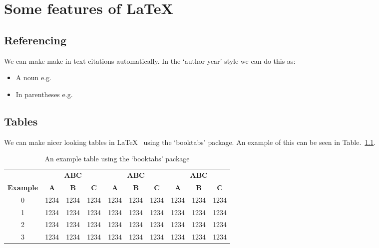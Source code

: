 \chapter{Some features of \LaTeX}

\section{Referencing}
We can make make in text citations automatically.
In the `author-year' style we can do this as:
\begin{itemize}
    \item A noun e.g. \textcite{Gillard2014}
    \item In parentheses e.g. \parencite{Gillard2014}
\end{itemize}

\section{Tables}
We can make nicer looking tables in \LaTeX~ using the `booktabs' package.
An example of this can be seen in Table.~\ref{fig:exampletable}.
\begin{table}[h]
\centering
\caption{An example table using the `booktabs' package}
\label{fig:exampletable}
\begin{tabular}{cccccccccc}
\toprule
& \multicolumn{3}{c}{\textbf{ABC}} & \multicolumn{3}{c}{\textbf{ABC}} & \multicolumn{3}{c}{\textbf{ABC}} \\
\cmidrule(lr){2-4}\cmidrule(lr){5-7}\cmidrule(lr){8-10}
\textbf{Example}      & \textbf{A}       & \textbf{B}       & \textbf{C}      & \textbf{A}           & \textbf{B}           & \textbf{C}          & \textbf{A}           & \textbf{B}           & \textbf{C}          \\
\cmidrule(lr){1-1}\cmidrule(lr){2-4}\cmidrule(lr){5-7}\cmidrule(lr){8-10}
0         & 1234      & 1234     & 1234     & 1234          & 1234         & 1234         & 1234        & 1234         & 1234         \\
1         & 1234      & 1234     & 1234     & 1234          & 1234         & 1234         & 1234          & 1234         & 1234         \\
2         & 1234      & 1234     & 1234     & 1234          & 1234         & 1234         & 1234        & 1234         & 1234        \\
3         & 1234      & 1234     & 1234     & 1234          & 1234         & 1234         & 1234        & 1234         & 1234         \\ \bottomrule
\end{tabular}
\end{table}

